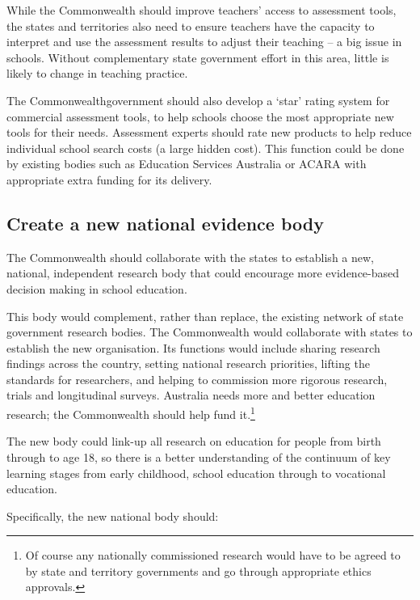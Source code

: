 While the Commonwealth should improve teachers' access to assessment tools, the states and territories also need to ensure teachers have the capacity to interpret and use the assessment results to adjust their teaching -- a big issue in schools. Without complementary state government effort in this area, little is likely to change in teaching practice.

The Commonwealth\space government should also develop a `star' rating system for commercial assessment tools, to help schools choose the most appropriate new tools for their needs. Assessment experts should rate new products to help reduce individual school search costs (a large hidden cost).  This function could be done by existing bodies such as Education Services Australia or ACARA with appropriate extra funding for its delivery.

\subsection{Create a new national evidence body}\label{subsec:evidence-national} 

The Commonwealth should collaborate with the states to establish a new, national, independent research body that could encourage more evidence-based decision making in school education.

This body would complement, rather than replace, the existing network of state government research bodies. The Commonwealth would collaborate with states to establish the new organisation. Its functions would include sharing research findings across the country, setting national research priorities, lifting the standards for researchers, and helping to commission more rigorous research, trials and longitudinal surveys. Australia needs more and better education research; the Commonwealth should help fund it.\footnote{Of course any nationally commissioned research would have to be agreed to by state and territory governments and go through appropriate ethics approvals.} 

The new body could link-up all research on education for people from birth through to age 18, so there is a better understanding of the continuum of key learning stages from early childhood, school education through to  vocational education.

Specifically, the new national body should:


